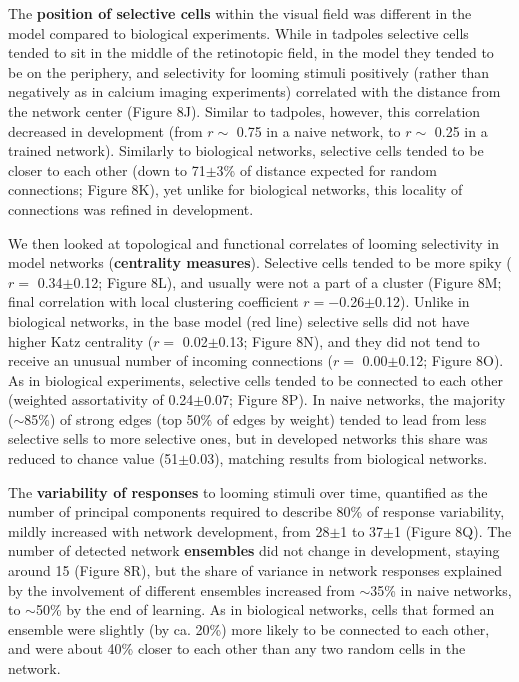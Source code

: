 \documentclass{article}
\begin{document}
The \textbf{position of selective cells} within the visual field was different in the model compared to biological experiments. While in tadpoles selective cells tended to sit in the middle of the retinotopic field, in the model they tended to be on the periphery, and selectivity for looming stimuli positively (rather than negatively as in calcium imaging experiments) correlated with the distance from the network center (Figure 8J). Similar to tadpoles, however, this correlation decreased in development (from $r\sim$ 0.75 in a naive network, to $r\sim$ 0.25 in a trained network). Similarly to biological networks, selective cells tended to be closer to each other (down to 71$\pm$3\% of distance expected for random connections; Figure 8K), yet unlike for biological networks, this locality of connections was refined in development.

We then looked at topological and functional correlates of looming selectivity in model networks (\textbf{centrality measures}). Selective cells tended to be more spiky ($r=$ 0.34$\pm$0.12; Figure 8L), and usually were not a part of a cluster (Figure 8M; final correlation with local clustering coefficient $r=-$0.26$\pm$0.12). Unlike in biological networks, in the base model (red line) selective sells did not have higher Katz centrality ($r=$ 0.02$\pm$0.13; Figure 8N), and they did not tend to receive an unusual number of incoming connections ($r=$ 0.00$\pm$0.12; Figure 8O). As in biological experiments, selective cells tended to be connected to each other (weighted assortativity of 0.24$\pm$0.07; Figure 8P). In naive networks, the majority ($\sim$85\%) of strong edges (top 50\% of edges by weight) tended to lead from less selective sells to more selective ones, but in developed networks this share was reduced to chance value (51$\pm$0.03), matching results from biological networks.

The \textbf{variability of responses} to looming stimuli over time, quantified as the number of principal components required to describe 80\% of response variability, mildly increased with network development, from 28$\pm$1 to 37$\pm$1 (Figure 8Q). The number of detected network \textbf{ensembles} did not change in development, staying around 15 (Figure 8R), but the share of variance in network responses explained by the involvement of different ensembles increased from $\sim$35\% in naive networks, to $\sim$50\% by the end of learning. As in biological networks, cells that formed an ensemble were slightly (by ca. 20\%) more likely to be connected to each other, and were about 40\% closer to each other than any two random cells in the network.
\end{document}
